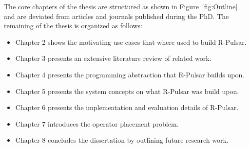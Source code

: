 The core chapters of the thesis are structured as shown in Figure~\ref{fig:Outline} and are deviated from articles and journals published during the PhD. The remaining of the thesis is organized as follows: 

\begin{itemize}
    \item Chapter 2 shows the motivating use cases that where used to build R-Pulsar. 
    \item Chapter 3 presents an extensive literature review of related work. 
    \item Chapter 4 presents the programming abstraction that R-Pulsar builds upon.
    \item Chapter 5 presents the system concepts on what R-Pulsar was build upon. 
    \item Chapter 6 presents the implementation and evaluation details of R-Pulsar. 
    \item Chapter 7 introduces the operator placement problem. 
    \item Chapter 8 concludes the dissertation by outlining future research work.
\end{itemize}

